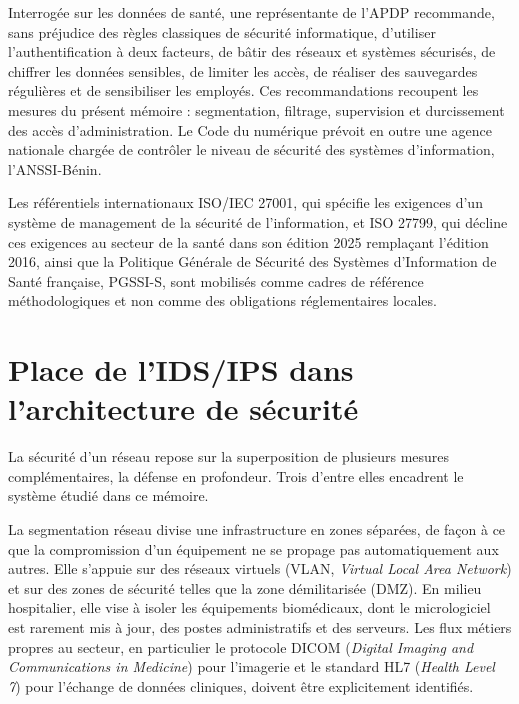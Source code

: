 Interrogée sur les données de santé, une représentante de l'APDP recommande, sans préjudice des règles classiques de sécurité informatique, d'utiliser l'authentification à deux facteurs, de bâtir des réseaux et systèmes sécurisés, de chiffrer les données sensibles, de limiter les accès, de réaliser des sauvegardes régulières et de sensibiliser les employés\cite{apdp2024}. Ces recommandations recoupent les mesures du présent mémoire : segmentation, filtrage, supervision et durcissement des accès d'administration. Le Code du numérique prévoit en outre une agence nationale chargée de contrôler le niveau de sécurité des systèmes d'information, l'ANSSI-Bénin\cite{codenum}.

Les référentiels internationaux ISO/IEC 27001, qui spécifie les exigences d'un système de management de la sécurité de l'information\cite{iso27001}, et ISO 27799, qui décline ces exigences au secteur de la santé dans son édition 2025 remplaçant l'édition 2016\cite{iso27799}, ainsi que la Politique Générale de Sécurité des Systèmes d'Information de Santé française, PGSSI-S\cite{pgssis}, sont mobilisés comme cadres de référence méthodologiques et non comme des obligations réglementaires locales.

\section{Place de l'IDS/IPS dans l'architecture de sécurité}

La sécurité d'un réseau repose sur la superposition de plusieurs mesures complémentaires, la défense en profondeur. Trois d'entre elles encadrent le système étudié dans ce mémoire.

La segmentation réseau divise une infrastructure en zones séparées, de façon à ce que la compromission d'un équipement ne se propage pas automatiquement aux autres. Elle s'appuie sur des réseaux virtuels (VLAN, \emph{Virtual Local Area Network}) et sur des zones de sécurité telles que la zone démilitarisée (DMZ). En milieu hospitalier, elle vise à isoler les équipements biomédicaux, dont le micrologiciel est rarement mis à jour, des postes administratifs et des serveurs. Les flux métiers propres au secteur, en particulier le protocole DICOM (\emph{Digital Imaging and Communications in Medicine}) pour l'imagerie et le standard HL7 (\emph{Health Level 7}) pour l'échange de données cliniques, doivent être explicitement identifiés.

